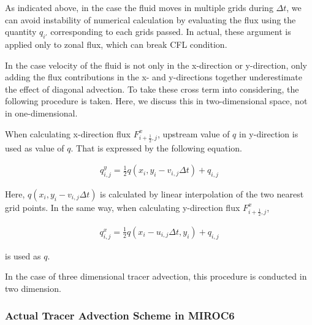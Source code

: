 As indicated above, in the case the fluid moves in multiple grids during \(\Delta t\), we can avoid instability of numerical calculation by evaluating the flux using the quantity \(q_{i'}\)
corresponding to each grids passed. In actual, these argument is applied only to zonal flux, which can break CFL condition.

In the case velocity of the fluid is not only in the x-direction or y-direction, only adding the flux contributions in the x- and y-directions together underestimate the effect of diagonal advection.
To take these cross term into considering, the following procedure is taken. Here, we discuss this in two-dimensional space, not in one-dimensional.

When calculating x-direction flux \(F^{x}_{i+\frac{1}{2},j}\), upstream value of \(q\) in y-direction is used as value of \(q\). That is expressed by the following equation.

\begin{eqnarray}
q^{y}_{i,j}=\frac{1}{2} {q(x_{i},y_{i}-v_{i,j}\Delta t)+q_{i,j}}
\end{eqnarray}

Here, \(q(x_{i},y_{i}-v_{i,j}\Delta t)\) is calculated by linear interpolation of the two nearest grid points. In the same way, when calculating y-direction flux \(F^{x}_{i+\frac{1}{2},j}\),

\begin{eqnarray}
q^{x}_{i,j}=\frac{1}{2} {q(x_{i}-u_{i,j}\Delta t,y_{i})+q_{i,j}}
\end{eqnarray}

is used as \(q\).

In the case of three dimensional tracer advection, this procedure is conducted in two dimension.

\hypertarget{actual-tracer-advection-scheme-in-miroc6}{%
\subsubsection{Actual Tracer Advection Scheme in MIROC6}\label{actual-tracer-advection-scheme-in-miroc6}}

